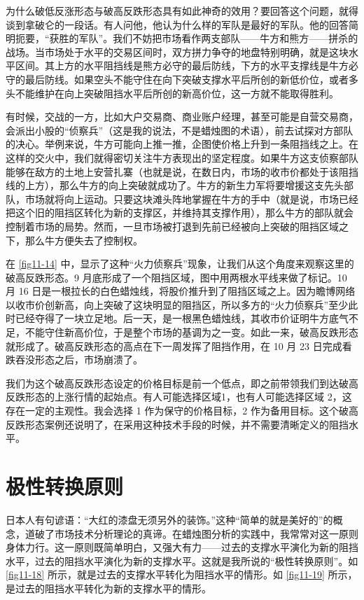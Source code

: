 
为什么破低反涨形态与破高反跌形态具有如此神奇的效用？要回答这个问题，就得谈到拿破仑的一段话。有人问他，他认为什么样的军队是最好的军队。他的回答简明扼要，“获胜的军队”。我们不妨把市场看作两支部队——牛方和熊方——拼杀的战场。当市场处于水平的交易区间时，双方拼力争夺的地盘特别明确，就是这块水平区间。其上方的水平阻挡线是熊方必守的最后防线，下方的水平支撑线是牛方必守的最后防线。如果空头不能守住在向下突破支撑水平后所创的新低价位，或者多头不能维护在向上突破阻挡水平后所创的新高价位，这一方就不能取得胜利。

有时候，交战的一方，比如大户交易商、商业账户经理，甚至可能是自营交易商，会派出小股的“侦察兵”（这是我的说法，不是蜡烛图的术语），前去试探对方部队的决心。举例来说，牛方可能向上推一推，企图使价格上升到一条阻挡线之上。在这样的交火中，我们就得密切关注牛方表现出的坚定程度。如果牛方这支侦察部队能够在敌方的土地上安营扎寨（也就是说，在数日内，市场的收市价都处于该阻挡线的上方），那么牛方的向上突破就成功了。牛方的新生力军将要增援这支先头部队，市场就将向上运动。只要这块滩头阵地掌握在牛方的手中（就是说，市场已经把这个旧的阻挡区转化为新的支撑区，并维持其支撑作用），那么牛方的部队就会控制着市场的局势。然而，一旦市场被打退到先前已经被向上突破的阻挡区域之下，那么牛方便失去了控制权。

在 \autoref{fig11-14} 中，显示了这种“火力侦察兵”现象，让我们从这个角度来观察这里的破高反跌形态。9 月底形成了一个阻挡区域，图中用两根水平线来做了标记。10 月 16 日是一根拉长的白色蜡烛线，将股价推升到了阻挡区域之上。因为瞻博网络以收市价创新高，向上突破了这块明显的阻挡区，所以多方的“火力侦察兵”至少此时已经夺得了一块立足地。后一天，是一根黑色蜡烛线，其收市价证明牛方底气不足，不能守住新高价位，于是整个市场的基调为之一变。如此一来，破高反跌形态就形成了。破高反跌形态的高点在下一周发挥了阻挡作用，在 10 月 23 日完成看跌吞没形态之后，市场崩溃了。

我们为这个破高反跌形态设定的价格目标是前一个低点，即之前带领我们到达破高反跌形态的上涨行情的起始点。有人可能选择区域1，也有人可能选择区域 2，这存在一定的主观性。我会选择 1 作为保守的价格目标，2 作为备用目标。这个破高反跌形态案例还说明了，在采用这种技术手段的时候，并不需要清晰定义的阻挡水平。


\section{极性转换原则}
日本人有句谚语：“大红的漆盘无须另外的装饰。”这种“简单的就是美好的”的概念，道破了市场技术分析理论的真谛。在蜡烛图分析的实践中，我常常对这一原则身体力行。这一原则既简单明白，又强大有力——过去的支撑水平演化为新的阻挡水平，过去的阻挡水平演化为新的支撑水平。这就是我所说的“极性转换原则”。如 \autoref{fig11-18} 所示，就是过去的支撑水平转化为阻挡水平的情形。如 \autoref{fig11-19} 所示，是过去的阻挡水平转化为新的支撑水平的情形。

